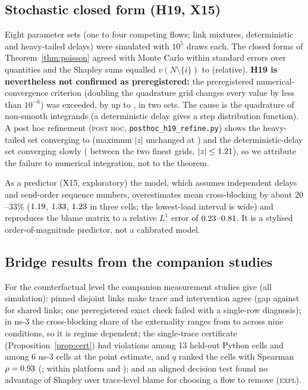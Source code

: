 \documentclass[11pt]{article}
\newcommand{\tagE}{\textsc{expl}}
\newcommand{\tagP}{\textsc{post hoc}}
\theoremstyle{definition}
\begin{document}
\subsection{Stochastic closed form (H19, X15)}\label{sec:val-poisson}
Eight parameter sets (one to four competing flows; link mixtures, deterministic and heavy-tailed delays) were simulated with $10^5$ draws each. The closed forms of Theorem~\ref{thm:poisson} agreed with Monte Carlo within \FvMaxZ{} standard errors over \FvNQuant{} quantities and the Shapley sums equalled $v(N\setminus\{i\})$ to \FvEffGap{} (relative). \textbf{H19 is nevertheless not confirmed as preregistered:} the preregistered numerical-convergence criterion (doubling the quadrature grid changes every value by less than $10^{-6}$) was exceeded, by up to \FvQuadMax{}, in two sets. The cause is the quadrature of non-smooth integrands (a deterministic delay gives a step distribution function). A post hoc refinement (\tagP{}, \texttt{posthoc\_h19\_refine.py}) shows the heavy-tailed set converging to \FvRefDriftS{} (maximum $|z|$ unchanged at \FvRefZS{}) and the deterministic-delay set converging slowly (\FvRefDriftP{} between the two finest grids, $|z|\le1.21{}$), so we attribute the failure to numerical integration, not to the theorem.
\begin{table}[h]
\centering\small

\caption{X15 (\tagE{}): a-priori prediction in the Python simulator (S4 FIFO) from flow rates and the empirical delay law of calibration seeds, against observed cross-blocking on held-out seeds; blame error is the relative $L^1$ error of the 12-entry blame matrix.}
\end{table}
As a predictor (X15, exploratory) the model, which assumes independent delays and send-order sequence numbers, overestimates mean cross-blocking by about $20$--$33\%$ ($1.19{}$, $1.33{}$, $1.23{}$ in three cells; the lowest-load interval is wide) and reproduces the blame matrix to a relative $L^1$ error of $0.23{}$--$0.81{}$. It is a stylised order-of-magnitude predictor, not a calibrated model.

\subsection{Bridge results from the companion studies}
For the counterfactual level the companion measurement studies give (all simulation): pinned disjoint links make trace and intervention agree (gap \TenGapPinned{} against \TenGapShared{} for shared links; one preregistered exact check failed with a single-row diagnosis); in ns-3 the cross-blocking share of the externality ranges from \ElevenMin{} to \ElevenMax{} across nine conditions, so it is regime dependent; the single-trace certificate (Proposition~\ref{prop:cert}) had \FourPyViol{} violations among 13 held-out Python cells and \FourNsViol{} among 6 ns-3 cells at the point estimate, and $q$ ranked the cells with Spearman $\rho=0.93$ (\FourRhoCI{}; within platform \FourRhoPy{} and \FourRhoNs{}); and an aligned decision test found no advantage of Shapley over trace-level blame for choosing a flow to remove (\tagE{}).
\end{document}
